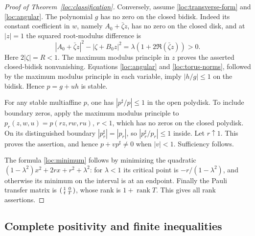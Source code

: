 \documentclass[reqno]{amsart}
\theoremstyle{definition}
\theoremstyle{remark}
\DeclareMathOperator{\rank}{rank}
\begin{document}
\begin{proof}[Proof of Theorem~\ref{loc:classification}]
Conversely, assume \eqref{loc:transverse-form} and
\eqref{loc:angular}.  The polynomial $g$ has no zero on the closed
bidisk.  Indeed its constant coefficient in $w$, namely
$A_0+\bar\zeta z$, has no zero on the closed disk, and at $|z|=1$
the squared root-modulus difference is
\[
 |A_0+\bar\zeta z|^2-|\zeta+B_0z|^2
       =\lambda(1+2\Re(\bar\zeta z))>0.
\]
Here $2|\zeta|=R<1$.  The maximum modulus principle in $z$ proves
the asserted closed-bidisk nonvanishing.  Equations
\eqref{loc:angular} and \eqref{loc:torus-norms}, followed by the
maximum modulus principle in each variable, imply $|h/g|\leq1$ on
the bidisk.  Hence $p=g+uh$ is stable.

For any stable multiaffine $p$, one has $|p^\sharp/p|\leq1$ in the
open polydisk.  To include boundary zeros, apply the maximum modulus
principle to $p_r(z,w,u)=p(rz,rw,ru)$, $r<1$, which has no zeros on
the closed polydisk.  On its distinguished boundary
$|p_r^\sharp|=|p_r|$, so $|p_r^\sharp/p_r|\leq1$ inside.
Let $r\uparrow1$.  This proves the assertion, and hence
$p+vp^\sharp\ne0$ when $|v|<1$.  Sufficiency follows.

The formula \eqref{loc:minimum} follows by minimizing the quadratic
$(1-\lambda^2)x^2+2rx+r^2+\lambda^2$: for $\lambda<1$ its critical
point is $-r/(1-\lambda^2)$, and otherwise its minimum on the interval
is at an endpoint.  Finally the Pauli transfer matrix is
$\begin{psmallmatrix}1&0\\t&T\end{psmallmatrix}$, whose rank is
$1+\rank T$.  This gives all rank assertions.
\end{proof}

\subsection{Complete positivity and finite inequalities}
\end{document}

